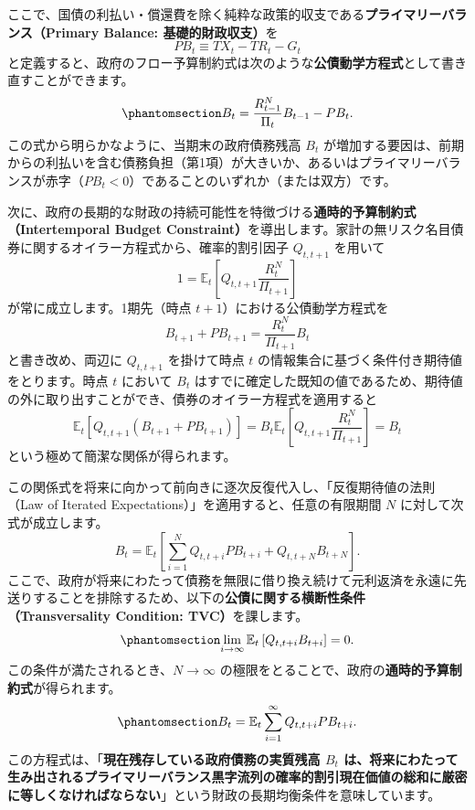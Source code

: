 \documentclass[
  japanese,
  lualatex,
  ja=standard,
  12pt,
  a4paper]{ltjsarticle}
\begin{document}
ここで、国債の利払い・償還費を除く純粋な政策的収支である\textbf{プライマリーバランス（Primary
Balance: 基礎的財政収支）}を \[
PB_t \equiv TX_t - TR_t - G_t
\]
と定義すると、政府のフロー予算制約式は次のような\textbf{公債動学方程式}として書き直すことができます。
\begin{equation}\protect\phantomsection\label{eq-government-debt-law}{
B_t = \frac{R_{t-1}^N}{\Pi_t} B_{t-1} - PB_t.
}\end{equation} この式から明らかなように、当期末の政府債務残高 \(B_t\)
が増加する要因は、前期からの利払いを含む債務負担（第1項）が大きいか、あるいはプライマリーバランスが赤字（\(PB_t < 0\)）であることのいずれか（または双方）です。

次に、政府の長期的な財政の持続可能性を特徴づける\textbf{通時的予算制約式（Intertemporal
Budget
Constraint）}を導出します。家計の無リスク名目債券に関するオイラー方程式から、確率的割引因子
\(Q_{t,t+1}\) を用いて \[
1 = \mathbb{E}_t \left[ Q_{t,t+1} \frac{R_t^N}{\Pi_{t+1}} \right]
\] が常に成立します。1期先（時点 \(t+1\)）における公債動学方程式を \[
B_{t+1} + PB_{t+1} = \frac{R_t^N}{\Pi_{t+1}} B_t
\] と書き改め、両辺に \(Q_{t,t+1}\) を掛けて時点 \(t\)
の情報集合に基づく条件付き期待値をとります。時点 \(t\) において \(B_t\)
はすでに確定した既知の値であるため、期待値の外に取り出すことができ、債券のオイラー方程式を適用すると
\[
\mathbb{E}_t \left[ Q_{t,t+1} (B_{t+1} + PB_{t+1}) \right] = B_t \mathbb{E}_t \left[ Q_{t,t+1} \frac{R_t^N}{\Pi_{t+1}} \right] = B_t
\] という極めて簡潔な関係が得られます。

この関係式を将来に向かって前向きに逐次反復代入し、「反復期待値の法則（Law
of Iterated Expectations）」を適用すると、任意の有限期間 \(N\)
に対して次式が成立します。 \[
B_t = \mathbb{E}_t \left[ \sum_{i=1}^N Q_{t,t+i} PB_{t+i} + Q_{t,t+N} B_{t+N} \right].
\]
ここで、政府が将来にわたって債務を無限に借り換え続けて元利返済を永遠に先送りすることを排除するため、以下の\textbf{公債に関する横断性条件（Transversality
Condition: TVC）}を課します。
\begin{equation}\protect\phantomsection\label{eq-government-transversality}{
\lim_{i \to \infty} \mathbb{E}_t \left[ Q_{t,t+i} B_{t+i} \right] = 0.
}\end{equation} この条件が満たされるとき、\(N \to \infty\)
の極限をとることで、政府の\textbf{通時的予算制約式}が得られます。
\begin{equation}\protect\phantomsection\label{eq-government-intertemporal-budget}{
B_t = \mathbb{E}_t \sum_{i=1}^\infty Q_{t,t+i} PB_{t+i}.
}\end{equation}
この方程式は、「\textbf{現在残存している政府債務の実質残高 \(B_t\)
は、将来にわたって生み出されるプライマリーバランス黒字流列の確率的割引現在価値の総和に厳密に等しくなければならない}」という財政の長期均衡条件を意味しています。
\end{document}
